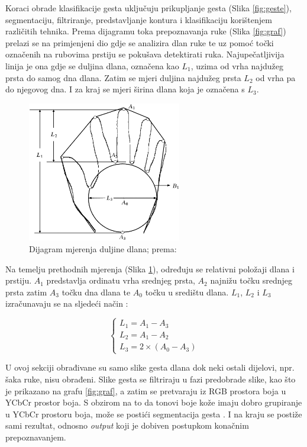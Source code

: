 \documentclass[]{foi} %
\begin{document}
Koraci obrade klasifikacije gesta \cite{hand2} uključuju prikupljanje gesta (Slika \ref{fig:geste}), segmentaciju, filtriranje, predstavljanje kontura i klasifikaciju korištenjem različitih tehnika. Prema dijagramu toka prepoznavanja ruke (Slika \ref{fig:graf}) prelazi se na primjenjeni dio gdje se analizira dlan ruke te uz pomoć točki označenih na rubovima prstiju se pokušava detektirati ruka. Najupečatljivija linija je ona gdje se duljina dlana, označena kao $L_1$, uzima od vrha najdužeg prsta do samog dna dlana. Zatim se mjeri duljina najdužeg prsta $L_2$ od vrha pa do njegovog dna. I za kraj se mjeri širina dlana koja je označena s $L_3$.

\begin{figure}[!ht]
    \centering
    \includegraphics[width=0.6\textwidth]{slike/saka.png}
    \caption{Dijagram mjerenja duljine dlana; prema: \cite{hand4}}
    \label{fig:saka}
\end{figure}

\newpage
Na temelju prethodnih mjerenja (Slika \ref{fig:saka}), određuju se relativni položaji dlana i prstiju. $A_1$ predstavlja ordinatu vrha srednjeg prsta, $A_2$ najnižu točku srednjeg prsta zatim $A_3$ točku dna dlana te $A_0$ točku u središtu dlana. $L_1$, $L_2$ i $L_3$ izračunavaju se na sljedeći način \cite{hand4}:

\[
\left\{ \begin{array}{rcl} 
                L_1 = A_1 - A_3\\ 
                L_2 = A_1 - A_2 \\
                L_3 = 2 \times (A_0-A_3)
        \end{array}\right.
\]

U ovoj sekciji obrađivane su samo slike gesta dlana dok neki ostali dijelovi, npr. šaka ruke, nisu obrađeni. Slike gesta se filtriraju u fazi predobrade slike, kao što je prikazano na grafu \ref{fig:graf}, a zatim se pretvaraju iz RGB prostora boja u YCbCr prostor boja. S obzirom na to da tonovi boje kože imaju dobro grupiranje u YCbCr prostoru boja, može se postići segmentacija gesta \cite{hand4}. I na kraju se postiže sami rezultat, odnosno \textit{output} koji je dobiven postupkom konačnim prepoznavanjem.
\end{document}
